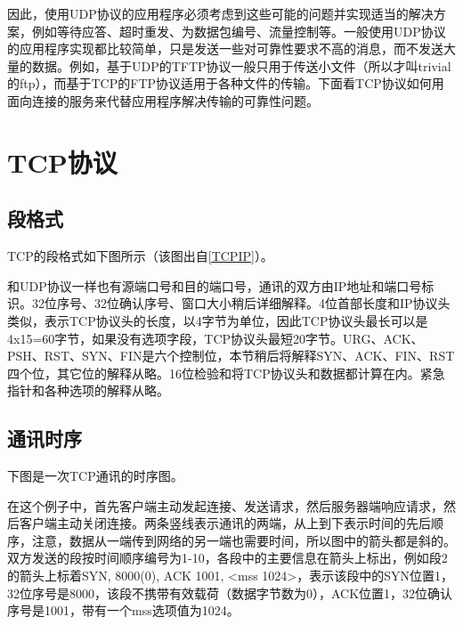 因此，使用UDP协议的应用程序必须考虑到这些可能的问题并实现适当的解决方案，例如等待应答、超时重发、为数据包编号、流量控制等。一般使用UDP协议的应用程序实现都比较简单，只是发送一些对可靠性要求不高的消息，而不发送大量的数据。例如，基于UDP的TFTP协议一般只用于传送小文件（所以才叫trivial的ftp），而基于TCP的FTP协议适用于各种文件的传输。下面看TCP协议如何用面向连接的服务来代替应用程序解决传输的可靠性问题。




\section{TCP协议}
%
\subsection{段格式}
%


TCP的段格式如下图所示（该图出自\hyperlink{db.bi01.bibli.tcpip}{[TCPIP]}）。




和UDP协议一样也有源端口号和目的端口号，通讯的双方由IP地址和端口号标识。32位序号、32位确认序号、窗口大小稍后详细解释。4位首部长度和IP协议头类似，表示TCP协议头的长度，以4字节为单位，因此TCP协议头最长可以是4x15=\BookSplit{}60字节，如果没有选项字段，TCP协议头最短20字节。URG、ACK、PSH、RST、SYN、FIN是六个控制位，本节稍后将解释SYN、ACK、FIN、RST四个位，其它位的解释从略。16位检验和将TCP协议头和数据都计算在内。紧急指针和各种选项的解释从略。


\subsection{通讯时序}
%


下图是一次TCP通讯的时序图。




在这个例子中，首先客户端主动发起连接、发送请求，然后服务器端响应请求，然后客户端主动关闭连接。两条竖线表示通讯的两端，从上到下表示时间的先后顺序，注意，数据从一端传到网络的另一端也需要时间，所以图中的箭头都是斜的。双方发送的段按时间顺序编号为1-10，各段中的主要信息在箭头上标出，例如段2的箭头上标着SYN, 8000(0), ACK 1001, \textless{}mss 1024\textgreater{}，表示该段中的SYN位置1，32位序号是8000，该段不携带有效载荷（数据字节数为0），ACK位置1，32位确认序号是1001，带有一个mss选项值为1024。



